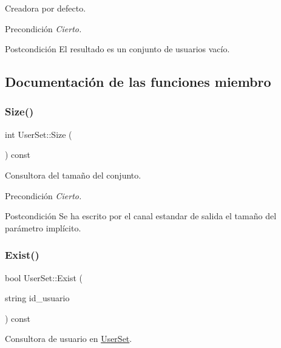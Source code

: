 Creadora por defecto. 

\begin{DoxyPrecond}{Precondición}
{\itshape Cierto.} 
\end{DoxyPrecond}
\begin{DoxyPostcond}{Postcondición}
El resultado es un conjunto de usuarios vacío. 
\end{DoxyPostcond}


\subsection{Documentación de las funciones miembro}
\mbox{\label{class_user_set_a2474615357041661d6c00ce66209e747}} 
\subsubsection{\texorpdfstring{Size()}{Size()}}
{\footnotesize\ttfamily int User\+Set\+::\+Size (\begin{DoxyParamCaption}{ }\end{DoxyParamCaption}) const}



Consultora del tamaño del conjunto. 

\begin{DoxyPrecond}{Precondición}
{\itshape Cierto.} 
\end{DoxyPrecond}
\begin{DoxyPostcond}{Postcondición}
Se ha escrito por el canal estandar de salida el tamaño del parámetro implícito. 
\end{DoxyPostcond}
\mbox{\label{class_user_set_a71ead20f591befdba9f6a1e524fa3271}} 
\subsubsection{\texorpdfstring{Exist()}{Exist()}}
{\footnotesize\ttfamily bool User\+Set\+::\+Exist (\begin{DoxyParamCaption}\item[{string}]{id\+\_\+usuario }\end{DoxyParamCaption}) const}



Consultora de usuario en \mbox{\hyperlink{class_user_set}{User\+Set}}. 

